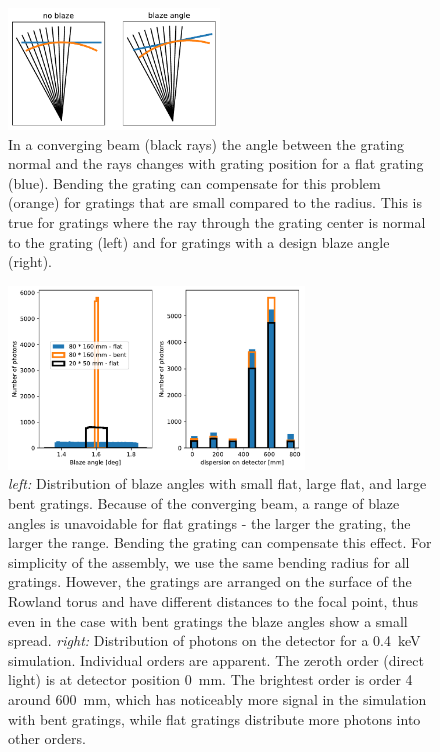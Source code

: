 \documentclass[]{spie}  %
\begin{document}
\begin{figure} [ht]
\begin{center}
\includegraphics[width=0.5\textwidth]{explainbending}
\end{center}
\caption {\label{fig:explainbending}
In a converging beam (black rays) the angle between the grating normal and the rays changes with grating position for a flat grating (blue). Bending the grating can compensate for this problem (orange) for gratings that are small compared to the radius. This is true for gratings where the ray through the grating center is normal to the grating (left) and for gratings with a design blaze angle (right).
}
\end{figure}

\begin{figure} [ht]
\begin{center}
\includegraphics[width=0.7\textwidth]{blazebend}
\end{center}
\caption {\label{fig:blazebend}
\emph{left:} Distribution of blaze angles with small flat, large flat, and large bent gratings. Because of the converging beam, a range of blaze angles is unavoidable for flat gratings - the larger the grating, the larger the range. Bending the grating can compensate this effect. For simplicity of the assembly, we use the same bending radius for all gratings. However, the gratings are arranged on the surface of the Rowland torus and have different distances to the focal point, thus even in the case with bent gratings the blaze angles show a small spread.
\emph{right:} Distribution of photons on the detector for a 0.4~keV simulation. Individual orders are apparent. The zeroth order (direct light) is at detector position 0~mm. The brightest order is order 4 around 600~mm, which has noticeably more signal in the simulation with bent gratings, while flat gratings distribute more photons into other orders.
}
\end{figure}
\end{document}
